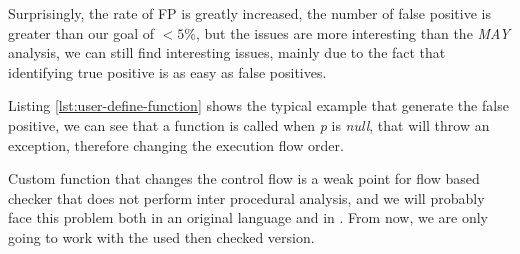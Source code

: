 Surprisingly, the rate of FP is greatly increased, the number of false positive is greater than our goal of $<5\%$, but the issues are more interesting than the \emph{MAY} analysis, we can still find interesting issues, mainly due to the fact that identifying true positive is as easy as false positives.

 

Listing \ref{lst:user-define-function} shows the typical example that generate the false positive, we can see that a function is called when \emph{p} is \emph{null}, that will throw an exception, therefore changing the execution flow order.

Custom function that changes the control flow is a weak point for flow based checker that does not perform inter procedural analysis, and we will probably face this problem both in an original language and in \slang{}. From now, we are only going to work with the used then checked version.




